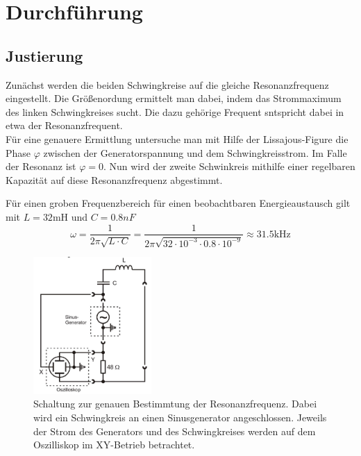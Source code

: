\newpage
\section{Durchführung}
\subsection{Justierung}
Zunächst werden die beiden Schwingkreise auf die gleiche Resonanzfrequenz eingestellt.
Die Größenordung ermittelt man dabei, indem das Strommaximum des linken Schwingkreises sucht.
Die dazu gehörige Frequent sntspricht dabei in etwa der Resonanzfrequent.\\
Für eine genauere Ermittlung untersuche man mit Hilfe der Lissajous-Figure die Phase $\varphi$
zwischen der Generatorspannung und dem Schwingkreisstrom. Im Falle der Resonanz ist $\varphi=0$.
Nun wird der zweite Schwinkreis mithilfe einer regelbaren Kapazität auf diese Resonanzfrequenz
abgestimmt.\newline

Für einen groben Frequenzbereich für einen beobachtbaren Energieaustausch gilt 
mit $L=32$mH und $C=0.8nF$
\begin{equation}
    \omega = \frac{1}{2 \pi \sqrt{L\cdot C}} = \frac{1}{2 \pi \sqrt{32\cdot 10^{-3}\cdot 0.8\cdot 10^{-9}}}\approx 31.5\text{kHz} 
\end{equation}   
\begin{figure}
    \centering
    \includegraphics[width=0.4\textwidth]{bilder/justierung.jpg}
    \caption{
        Schaltung zur genauen Bestimmtung der Resonanzfrequenz.
        Dabei wird ein Schwingkreis an einen Sinusgenerator angeschlossen.
        Jeweils der Strom des Generators und des Schwingkreises werden auf 
        dem Oszilliskop im XY-Betrieb betrachtet. \cite[305]{Anleitung}
    }
    \label{fig:justierung}
\end{figure}



